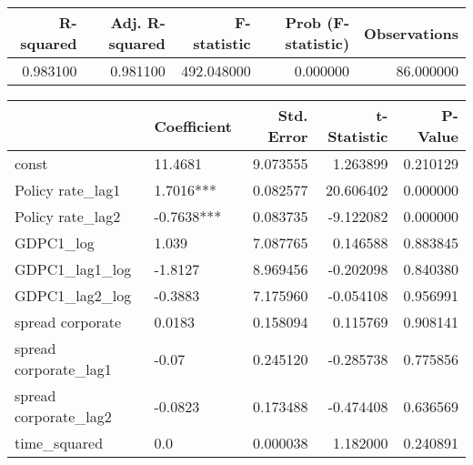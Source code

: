 \begin{tabular}{rrrrr}
\toprule
\textbf{R-squared} & \textbf{Adj. R-squared} & \textbf{F-statistic} & \textbf{Prob (F-statistic)} & \textbf{Observations} \\
\midrule
0.983100 & 0.981100 & 492.048000 & 0.000000 & 86.000000 \\
\bottomrule
\end{tabular}

\begin{tabular}{llrrr}
\toprule
 & \textbf{Coefficient} & \textbf{Std. Error} & \textbf{t-Statistic} & \textbf{P-Value} \\
\midrule
const & 11.4681 & 9.073555 & 1.263899 & 0.210129 \\
Policy rate_lag1 & 1.7016*** & 0.082577 & 20.606402 & 0.000000 \\
Policy rate_lag2 & -0.7638*** & 0.083735 & -9.122082 & 0.000000 \\
GDPC1_log & 1.039 & 7.087765 & 0.146588 & 0.883845 \\
GDPC1_lag1_log & -1.8127 & 8.969456 & -0.202098 & 0.840380 \\
GDPC1_lag2_log & -0.3883 & 7.175960 & -0.054108 & 0.956991 \\
spread corporate & 0.0183 & 0.158094 & 0.115769 & 0.908141 \\
spread corporate_lag1 & -0.07 & 0.245120 & -0.285738 & 0.775856 \\
spread corporate_lag2 & -0.0823 & 0.173488 & -0.474408 & 0.636569 \\
time_squared & 0.0 & 0.000038 & 1.182000 & 0.240891 \\
\bottomrule
\end{tabular}
